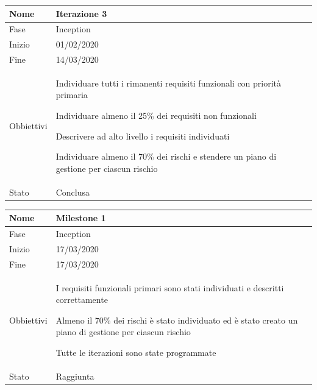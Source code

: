\begin{center}
\begin{tabular}{ |p{2cm}|p{10cm}|  }
\hline
Nome & Iterazione 3 \\\hline
Fase & Inception \\\hline
Inizio & 01/02/2020 \\\hline
Fine &  14/03/2020 \\\hline
Obbiettivi & 
	\begin{compactitem}
		\item Individuare tutti i rimanenti requisiti funzionali con priorità primaria
		\item Individuare almeno il 25\% dei requisiti non funzionali
		\item Descrivere ad alto livello i requisiti individuati
		\item Individuare almeno il 70\% dei rischi e stendere un piano di gestione per ciascun rischio
	\end{compactitem}\\\hline
Stato &  Conclusa \\\hline %
\end{tabular}
\label{table:3}\newline

\begin{tabular}{ |p{2cm}|p{10cm}|  }
\hline
Nome & Milestone 1\\\hline
Fase & Inception \\\hline
Inizio & 17/03/2020 \\\hline
Fine &  17/03/2020 \\\hline
Obbiettivi & 
	\begin{compactitem}
		\item I requisiti funzionali primari sono stati individuati e descritti correttamente
		\item Almeno il 70\% dei rischi è stato individuato ed è stato creato un piano di gestione per ciascun rischio
		\item Tutte le iterazioni sono state programmate
	\end{compactitem}\\\hline
Stato &  Raggiunta \\\hline
\end{tabular}
\label{table:milestone1}\newline


\end{center}
